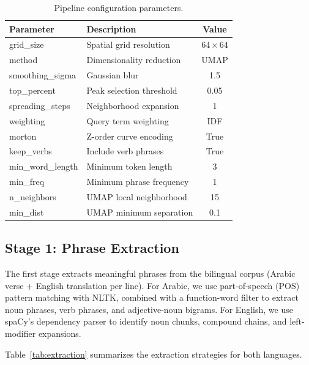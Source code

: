 \documentclass[conference]{IEEEtran}
\begin{document}
\begin{table}[h]
  \centering
  \caption{Pipeline configuration parameters.}
  \label{tab:params}
  \footnotesize
  \begin{tabular}{llc}
    \toprule
    \textbf{Parameter} & \textbf{Description} & \textbf{Value} \\
    \midrule
    grid\_size & Spatial grid resolution & $64 \times 64$ \\
    method & Dimensionality reduction & UMAP \\
    smoothing\_sigma & Gaussian blur & 1.5 \\
    top\_percent & Peak selection threshold & 0.05 \\
    spreading\_steps & Neighborhood expansion & 1 \\
    weighting & Query term weighting & IDF \\
    morton & Z-order curve encoding & True \\
    keep\_verbs & Include verb phrases & True \\
    min\_word\_length & Minimum token length & 3 \\
    min\_freq & Minimum phrase frequency & 1 \\
    n\_neighbors & UMAP local neighborhood & 15 \\
    min\_dist & UMAP minimum separation & 0.1 \\
    \bottomrule
  \end{tabular}
\end{table}

\subsection{Stage 1: Phrase Extraction}

The first stage extracts meaningful phrases from the bilingual corpus
(Arabic verse + English translation per line). For Arabic, we use
part-of-speech (POS) pattern matching with NLTK, combined with a
function-word filter to extract noun phrases, verb phrases, and
adjective-noun bigrams. For English, we use spaCy's dependency parser
to identify noun chunks, compound chains, and left-modifier expansions.

Table~\ref{tab:extraction} summarizes the extraction strategies for both
languages.
\end{document}
